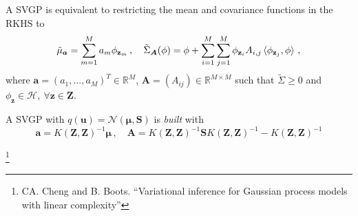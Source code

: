 \documentclass[aspectratio=149]{beamer}
\begin{document}
    \begin{frame}
        A SVGP is equivalent to restricting the mean and covariance functions in the RKHS to
        \begin{equation*}
            \tilde{\mu}_{\bm a} = \sum_{m=1}^{M} a_m \phi_{\mathbf{z}_m}\,, \quad \tilde{\Sigma}_{\bm{A}}(\phi) = \phi + \sum_{i=1}^{M}\sum_{j=1}^M\phi_{\mathbf{z}_i} A_{i,j} \braket{\phi_{\mathbf{z}_j}, \phi}\,,
        \end{equation*}
        where \(\bm{a} = (a_1, \dots, a_M)^T \in \mathbb{R}^M\), \(\bm{A} = (A_{ij}) \in \mathbb{R}^{M \times M} \) such that \(\tilde{\Sigma} \geq 0\) and \(\phi_{\mathbf{z}} \in \mathcal{H},\ \forall \mathbf{z} \in \mathbf{Z}\).

     A SVGP with \(q(\mathbf{u})  = \mathcal{N}(\bm \mu, \bm S)\) is \emph{built} with 
     \[
     \bm a = K(\mathbf{Z}, \mathbf{Z})^{-1}\bm \mu\,, \quad
     \bm{A} = K(\mathbf{Z}, \mathbf{Z})^{-1}\bm{S}K(\mathbf{Z}, \mathbf{Z})^{-1} - K(\mathbf{Z}, \mathbf{Z})^{-1}
     \]

    {\let\thefootnote\relax\footnote{{CA. Cheng and B. Boots. ``Variational inference for Gaussian process models with linear complexity''}}}
    \end{frame}
\end{document}
